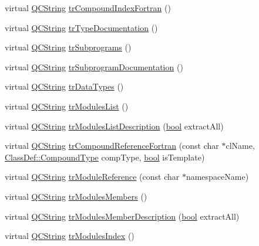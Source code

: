 \begin{DoxyCompactItemize}
virtual \hyperlink{class_q_c_string}{Q\+C\+String} \hyperlink{class_translator_greek_a3768a65c59f253ca17881ce265f5b23e}{tr\+Compound\+Index\+Fortran} ()
\item 
virtual \hyperlink{class_q_c_string}{Q\+C\+String} \hyperlink{class_translator_greek_adbf889d433a3a4b96cb5477884a61033}{tr\+Type\+Documentation} ()
\item 
virtual \hyperlink{class_q_c_string}{Q\+C\+String} \hyperlink{class_translator_greek_ab4d674e3cde5cc46bf59c74b2a2cf364}{tr\+Subprograms} ()
\item 
virtual \hyperlink{class_q_c_string}{Q\+C\+String} \hyperlink{class_translator_greek_a60dfbe2aabeaade3e43bf976f95e7ae4}{tr\+Subprogram\+Documentation} ()
\item 
virtual \hyperlink{class_q_c_string}{Q\+C\+String} \hyperlink{class_translator_greek_a449e141ff0362337ca545fd1aa3f27f0}{tr\+Data\+Types} ()
\item 
virtual \hyperlink{class_q_c_string}{Q\+C\+String} \hyperlink{class_translator_greek_a617664ec46372e2557437c484b0c9585}{tr\+Modules\+List} ()
\item 
virtual \hyperlink{class_q_c_string}{Q\+C\+String} \hyperlink{class_translator_greek_a2cff10ec76d16787fb67b6b14f8338e7}{tr\+Modules\+List\+Description} (\hyperlink{qglobal_8h_a1062901a7428fdd9c7f180f5e01ea056}{bool} extract\+All)
\item 
virtual \hyperlink{class_q_c_string}{Q\+C\+String} \hyperlink{class_translator_greek_a6b5f3f675c0c1438d8727227f621e071}{tr\+Compound\+Reference\+Fortran} (const char $\ast$cl\+Name, \hyperlink{class_class_def_ae70cf86d35fe954a94c566fbcfc87939}{Class\+Def\+::\+Compound\+Type} comp\+Type, \hyperlink{qglobal_8h_a1062901a7428fdd9c7f180f5e01ea056}{bool} is\+Template)
\item 
virtual \hyperlink{class_q_c_string}{Q\+C\+String} \hyperlink{class_translator_greek_aa1e3b8337ab7f6309b043255daa854ec}{tr\+Module\+Reference} (const char $\ast$namespace\+Name)
\item 
virtual \hyperlink{class_q_c_string}{Q\+C\+String} \hyperlink{class_translator_greek_a132b48c2bd5949fc1d7815794358c258}{tr\+Modules\+Members} ()
\item 
virtual \hyperlink{class_q_c_string}{Q\+C\+String} \hyperlink{class_translator_greek_af9a120937bf57581baa327cff7360f25}{tr\+Modules\+Member\+Description} (\hyperlink{qglobal_8h_a1062901a7428fdd9c7f180f5e01ea056}{bool} extract\+All)
\item 
virtual \hyperlink{class_q_c_string}{Q\+C\+String} \hyperlink{class_translator_greek_a1a764773f34e724b6efe31a37a4f79de}{tr\+Modules\+Index} ()

\end{DoxyCompactItemize}
